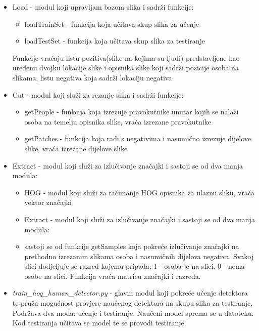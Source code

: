 \documentclass[times, utf8, seminar, numeric]{fer}
\begin{document}
\begin{itemize}

\item Load - modul koji upravljam bazom slika i sadrži funkcije:
\begin{itemize}
	\item loadTrainSet - funkcija koja učitava skup slika za učenje
	\item loadTestSet - funkcija koja učitava skup slika za testiranje
\end{itemize}

	Funkcije vraćaju listu pozitiva(slike na kojima su ljudi) predstavljene kao uređenu dvojku lokacije slike i opisnika slike koji sadrži pozicije osoba na slikama, listu negativa koja sadrži lokaciju negativa


\item Cut - modul koji služi za rezanje slika i sadrži funkcije:
\begin{itemize}
\item getPeople - funkcija koja izrezuje pravokutnike unutar kojih se nalazi osoba na temelju opisnika slike, vraća izrezane pravokutnike
\item getPatches - funkcija koja radi s negativima i nasumično izrezuje dijelove slike, vraća izrezane dijelove slike 
\end{itemize}

\item Extract - modul koji služi za izlučivanje značajki i sastoji se od dva manja modula:
\begin{itemize}
 \item HOG - modul koji služi za računanje HOG opisnika za ulaznu sliku, vraća vektor značajki
 \item Extract - modul koji služi za izlučivanje značajki i sastoji se od dva manja modula:
 \item sastoji se od funkcije getSamples koja pokreće izlučivanje značajki na prethodno izrezanim slikama osoba i nasumičnih dijelova negativa. Svakoj slici dodjeljuje se razred kojemu pripada: 1 - osoba je na slici, 0 - nema osobe na slici. Funkcija vraća matricu značajki i razreda. 
\end{itemize}

\item \emph{train\_hog\_human\_detector.py} - glavni modul koji pokreće učenje detektora te pruža mogućnost provjere naučenog detektora na skupu slika za testiranje.
	Podržava dva moda: učenje i testiranje. Naučeni model sprema se u datoteku. Kod testiranja učitava se model te se provodi testiranje.

\end{itemize}
\end{document}
